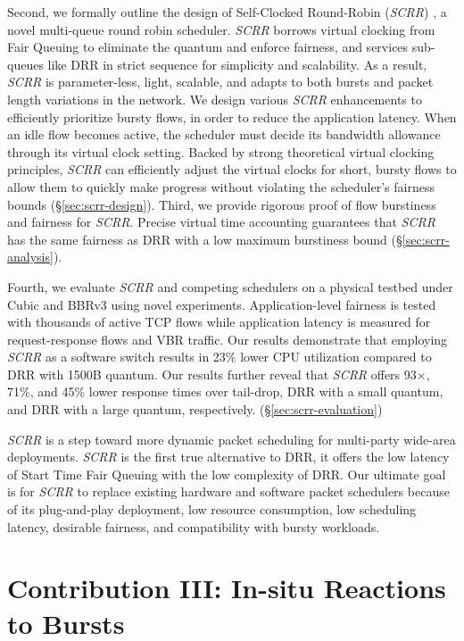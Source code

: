 Second, we formally outline the design of Self-Clocked Round-Robin
(\textit{SCRR}) \cite{scrr}, a novel multi-queue round robin scheduler. \textit{SCRR}
borrows virtual clocking from Fair Queuing \cite{stfq,scfq} to eliminate the quantum and enforce fairness, and services sub-queues like DRR in
strict sequence for simplicity and scalability. As a result, \textit{SCRR} is
parameter-less, light, scalable, and adapts to both bursts and
packet length variations in the network. We design various \textit{SCRR}
enhancements to efficiently prioritize bursty flows, in order to
reduce the application latency.
When an idle  flow becomes active, the scheduler must decide its bandwidth allowance through its virtual clock setting. 
Backed by strong theoretical virtual clocking principles, \textit{SCRR} can efficiently adjust the virtual clocks for short, bursty flows to allow them to quickly make progress without violating the scheduler's fairness bounds (\S\ref{sec:scrr-design}).
Third, we provide rigorous proof of flow burstiness and fairness for
\textit{SCRR}. Precise virtual time accounting guarantees
that \textit{SCRR} has the same fairness as DRR with a low maximum burstiness bound (\S\ref{sec:scrr-analysis}).

Fourth, we evaluate \textit{SCRR} and competing schedulers on a physical testbed under Cubic and BBRv3 
using novel experiments. Application-level
fairness is tested with thousands of active TCP flows while application latency is measured for request-response flows and VBR traffic.
Our results demonstrate that employing \textit{SCRR} as a software switch
results in 23\% lower CPU utilization compared to DRR with 1500B
quantum. Our results further reveal that \textit{SCRR} offers 93$\times$, 71\%,
and 45\% lower response times over tail-drop, DRR with a small
quantum, and DRR with a large quantum,
respectively. (\S\ref{sec:scrr-evaluation})

\textit{SCRR} is a step toward more dynamic packet scheduling for multi-party
wide-area deployments. \textit{SCRR} is the first true alternative to DRR, it
offers the low latency of Start Time Fair Queuing with the low
complexity of DRR. Our ultimate goal is for \textit{SCRR} to replace existing
hardware and software packet schedulers because of its plug-and-play
deployment, low resource consumption, low scheduling latency, 
desirable fairness, and compatibility with bursty workloads.

\section{Contribution III: In-situ Reactions to Bursts}

